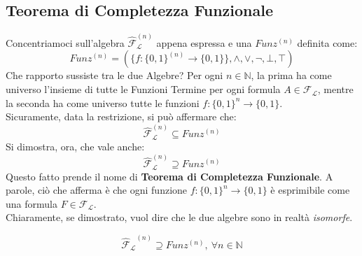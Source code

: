 \subsection{Teorema di Completezza Funzionale}
Concentriamoci sull'algebra $\hat{\mathscr{F}}_\mathscr{L}^{(n)}$ appena espressa e una $Funz^{(n)}$ definita come:
$$
Funz^{(n)} = (\{f: \{0,1\}^{(n)} \rightarrow \{0,1\}\}, \land, \lor, \neg, \bot, \top)
$$
Che rapporto sussiste tra le due Algebre?
Per ogni $n \in \mathbb{N}$, la prima ha come universo l'insieme di tutte le Funzioni Termine per ogni formula $A \in \mathscr{F_L}$, mentre la seconda ha come universo tutte le funzioni $f: \{0,1\}^n \rightarrow \{0,1\}$. \\
Sicuramente, data la restrizione, si può affermare che:
$$
\hat{\mathscr{F}}_\mathscr{L}^{(n)} \subseteq Funz^{(n)}
$$
Si dimostra, ora, che vale anche:
$$
\hat{\mathscr{F}}_\mathscr{L}^{(n)} \supseteq Funz^{(n)}
$$
Questo fatto prende il nome di \textbf{Teorema di Completezza Funzionale}. 
A parole, ciò che afferma è che ogni funzione $f: \{0,1\}^n \rightarrow \{0,1\}$ è esprimibile come una formula $F \in \mathscr{F_L}$. \\
Chiaramente, se dimostrato, vuol dire che le due algebre sono in realtà \textit{isomorfe}. 
\begin{teo}
$$
  \mathscr{\hat{F}_L}^{(n)} \supseteq Funz^{(n)},\ \forall n \in \mathbb{N}
$$
\end{teo}

